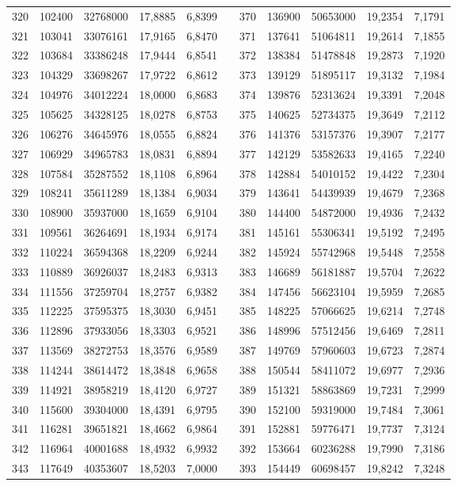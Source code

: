 \begin{longtable}{rrrrrrrrrrr}
320&102400&32768000&17,8885&6,8399&&370&136900&50653000&19,2354&7,1791\\
321&103041&33076161&17,9165&6,8470&&371&137641&51064811&19,2614&7,1855\\
322&103684&33386248&17,9444&6,8541&&372&138384&51478848&19,2873&7,1920\\
323&104329&33698267&17,9722&6,8612&&373&139129&51895117&19,3132&7,1984\\
324&104976&34012224&18,0000&6,8683&&374&139876&52313624&19,3391&7,2048\\
325&105625&34328125&18,0278&6,8753&&375&140625&52734375&19,3649&7,2112\\
326&106276&34645976&18,0555&6,8824&&376&141376&53157376&19,3907&7,2177\\
327&106929&34965783&18,0831&6,8894&&377&142129&53582633&19,4165&7,2240\\
328&107584&35287552&18,1108&6,8964&&378&142884&54010152&19,4422&7,2304\\
329&108241&35611289&18,1384&6,9034&&379&143641&54439939&19,4679&7,2368\\
330&108900&35937000&18,1659&6,9104&&380&144400&54872000&19,4936&7,2432\\
331&109561&36264691&18,1934&6,9174&&381&145161&55306341&19,5192&7,2495\\
332&110224&36594368&18,2209&6,9244&&382&145924&55742968&19,5448&7,2558\\
333&110889&36926037&18,2483&6,9313&&383&146689&56181887&19,5704&7,2622\\
334&111556&37259704&18,2757&6,9382&&384&147456&56623104&19,5959&7,2685\\
335&112225&37595375&18,3030&6,9451&&385&148225&57066625&19,6214&7,2748\\
336&112896&37933056&18,3303&6,9521&&386&148996&57512456&19,6469&7,2811\\
337&113569&38272753&18,3576&6,9589&&387&149769&57960603&19,6723&7,2874\\
338&114244&38614472&18,3848&6,9658&&388&150544&58411072&19,6977&7,2936\\
339&114921&38958219&18,4120&6,9727&&389&151321&58863869&19,7231&7,2999\\
340&115600&39304000&18,4391&6,9795&&390&152100&59319000&19,7484&7,3061\\
341&116281&39651821&18,4662&6,9864&&391&152881&59776471&19,7737&7,3124\\
342&116964&40001688&18,4932&6,9932&&392&153664&60236288&19,7990&7,3186\\
343&117649&40353607&18,5203&7,0000&&393&154449&60698457&19,8242&7,3248\\

\end{longtable}

